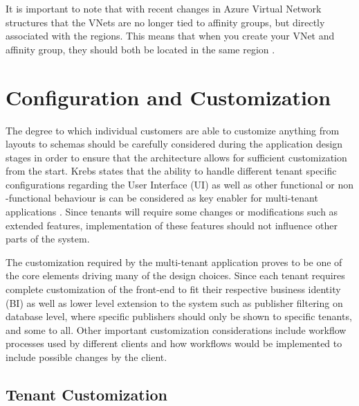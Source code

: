 It is important to note that with recent changes in Azure Virtual Network structures that the VNets are no longer tied to affinity groups, but directly associated with the regions. This means that when you create your VNet and affinity group, they should both be located in the same region \cite{Microsoft_Corporation2014-dn}.


\section{Configuration and Customization}

The degree to which individual customers are able to customize anything from layouts to schemas should be carefully considered during the application design stages in order to ensure that the architecture allows for sufficient customization from the start. Krebs states that the ability to handle different tenant specific configurations regarding the User Interface (UI) as well as other functional or non -functional behaviour is can be considered as key enabler for multi-tenant applications \cite{Krebs2012}. Since tenants will require some changes or modifications such as extended features, implementation of these features should not influence other parts of the system.
 
The customization required by the multi-tenant application proves to be one of the core elements driving many of the design choices. Since each tenant requires complete customization of the front-end to fit their respective business identity (BI) as well as lower level extension to the system such as publisher filtering on database level, where specific publishers should only be shown to specific tenants, and some to all. Other important customization considerations include workflow processes used by different clients and how workflows would be implemented to include possible changes by the client.


\subsection{Tenant Customization}

